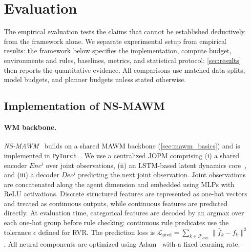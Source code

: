 \documentclass{article}
\theoremstyle{plain}
\theoremstyle{definition}
\theoremstyle{remark}
\begin{document}
\section{Evaluation}
\label{sec:eval}

The empirical evaluation tests the claims that cannot be established deductively from the framework alone. We separate experimental setup from empirical results: the framework below specifies the implementation, compute budget, environments and rules, baselines, metrics, and statistical protocol; \autoref{sec:results} then reports the quantitative evidence. All comparisons use matched data splits, model budgets, and planner budgets unless stated otherwise.

\subsection{Implementation of NS-MAWM}
\label{sec:impl_overview}


\paragraph{WM backbone.}
\textit{NS-MAWM}~\hyperref[fn:github]{\footnotemark[1]} builds on a shared MAWM backbone
(\autoref{sec:mawm_basics}) and is implemented in \texttt{PyTorch}~\cite{paszke2019pytorch}.
We use a centralized JOPM comprising
(i) a shared encoder $Enc^j$ over joint observations,
(ii) an LSTM-based latent dynamics core~\cite{hochreiter1997long},
and (iii) a decoder $Dec^j$ predicting the next joint observation.
Joint observations are concatenated along the agent dimension and embedded using MLPs with ReLU activations.
Discrete structured features are represented as one-hot vectors and treated as continuous outputs,
while continuous features are predicted directly.
At evaluation time, categorical features are decoded by an argmax over each one-hot group before rule checking; continuous rule predicates use the tolerance $\epsilon$ defined for RVR.
The prediction loss is
$\mathcal{L}_{\text{pred}} = \sum_{k \in \mathcal{F}_{\text{cont}}}\|\hat{f}_{k}-f_{k}\|^2$.
All neural components are optimized using Adam~\cite{kingma2017adammethodstochasticoptimization}
with a fixed learning rate.
\end{document}
